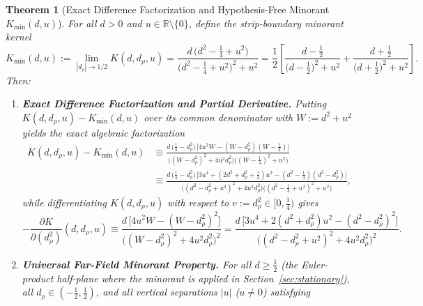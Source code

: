 \documentclass[11pt,reqno]{amsart}
\newtheorem{theorem}{Theorem}[section]
\theoremstyle{definition}
\theoremstyle{remark}
\numberwithin{equation}{section}
\newcommand{\R}{\mathbb{R}}
\begin{document}
\begin{theorem}[Exact Difference Factorization and Hypothesis-Free Minorant $K_{\min}(d,u)$]\label{thm:minorant}
For all $d > 0$ and $u \in \R \setminus \{0\}$, define the strip-boundary minorant kernel
\begin{equation}\label{eq:K_min_def}
K_{\min}(d,u) := \lim_{|d_\rho| \to 1/2} K(d, d_\rho, u) = \frac{d\,\bigl(d^2 - \frac{1}{4} + u^2\bigr)}{\bigl(d^2 - \frac{1}{4} + u^2\bigr)^2 + u^2} = \frac{1}{2}\left[\frac{d - \frac{1}{2}}{\bigl(d - \frac{1}{2}\bigr)^2 + u^2} + \frac{d + \frac{1}{2}}{\bigl(d + \frac{1}{2}\bigr)^2 + u^2}\right].
\end{equation}
Then:
\begin{enumerate}[label=\textup{(\roman*)},leftmargin=2.2em]
\item \textbf{Exact Difference Factorization and Partial Derivative.} Putting $K(d, d_\rho, u) - K_{\min}(d,u)$ over its common denominator with $W := d^2 + u^2$ yields the exact algebraic factorization
\begin{equation}\label{eq:diff_factorization}
\begin{aligned}
K(d, d_\rho, u) - K_{\min}(d,u)
&\equiv \frac{d\,\bigl(\frac{1}{4} - d_\rho^2\bigr)\,\bigl[4u^2 W - (W - d_\rho^2)(W - \frac{1}{4})\bigr]}{\bigl((W - d_\rho^2)^2 + 4u^2 d_\rho^2\bigr)\bigl((W - \frac{1}{4})^2 + u^2\bigr)} \\
&\equiv \frac{d\,\bigl(\frac{1}{4} - d_\rho^2\bigr)\,\bigl[3u^4 + (2d^2 + d_\rho^2 + \frac{1}{4})u^2 - (d^2 - \frac{1}{4})(d^2 - d_\rho^2)\bigr]}{\bigl((d^2 - d_\rho^2 + u^2)^2 + 4u^2 d_\rho^2\bigr)\bigl((d^2 - \frac{1}{4} + u^2)^2 + u^2\bigr)},
\end{aligned}
\end{equation}
while differentiating $K(d, d_\rho, u)$ with respect to $v := d_\rho^2 \in [0, \frac{1}{4})$ gives
\begin{equation}\label{eq:dK_dv}
-\frac{\partial K}{\partial(d_\rho^2)}(d, d_\rho, u) \equiv \frac{d\,\bigl[4u^2 W - (W - d_\rho^2)^2\bigr]}{\bigl((W - d_\rho^2)^2 + 4u^2 d_\rho^2\bigr)^2} = \frac{d\,\bigl[3u^4 + 2(d^2 + d_\rho^2)u^2 - (d^2 - d_\rho^2)^2\bigr]}{\bigl((d^2 - d_\rho^2 + u^2)^2 + 4u^2 d_\rho^2\bigr)^2}.
\end{equation}
\item \textbf{Universal Far-Field Minorant Property.} For all $d \ge \frac{1}{2}$ (the Euler-product half-plane where the minorant is applied in Section~\ref{sec:stationary}), all $d_\rho \in (-\frac{1}{2}, \frac{1}{2})$, and all vertical separations $|u|$ ($u \neq 0$) satisfying

\end{enumerate}
\end{theorem}
\end{document}
